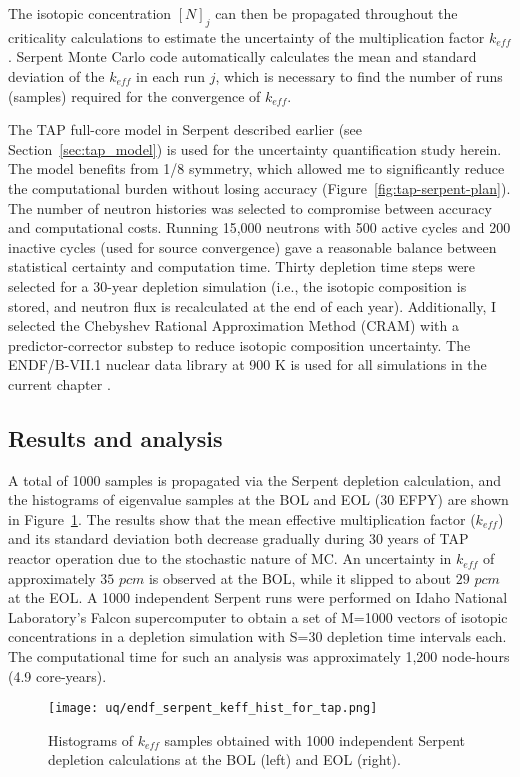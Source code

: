The isotopic concentration $[N]_j$ can then be propagated throughout the 
criticality calculations to estimate the uncertainty of the multiplication 
factor $k_{eff}$. Serpent Monte Carlo code automatically calculates the mean 
and standard deviation of the $k_{eff}$ in each run $j$, which is 
necessary to find the number of runs (samples) required for the convergence of 
$k_{eff}$.

The \gls{TAP} full-core model in Serpent described earlier (see  
Section~\ref{sec:tap_model}) is used for the uncertainty quantification study 
herein. The model benefits from 1/8 symmetry, which allowed me to 
significantly reduce the computational burden without losing accuracy
(Figure~\ref{fig:tap-serpent-plan}). The number of neutron histories was 
selected to compromise between accuracy and computational costs. Running 
15,000 neutrons with 500 active cycles and 200 inactive cycles 
(used for source convergence) gave a reasonable balance between statistical 
certainty and computation time. Thirty depletion time steps were 
selected for a 30-year depletion simulation (i.e., the isotopic composition is 
stored, and neutron flux is recalculated at the end of each year). 
Additionally, I selected the Chebyshev Rational Approximation Method (CRAM) 
with a predictor-corrector substep \cite{pusa_computing_2010} to reduce 
isotopic 
composition uncertainty. The ENDF/B-VII.1 nuclear data library at 900 K is 
used for all simulations in the current chapter 
\cite{chadwick_endf/b-vii.1_2011}.

\subsection{Results and analysis}
A total of 1000 samples is propagated via the Serpent depletion calculation,  
and the histograms of eigenvalue samples at the \gls{BOL} and \gls{EOL} (30 
\gls{EFPY}) are shown in Figure~\ref{fig:uq-serp-keff-hist}. The 
results show that the mean effective multiplication factor ($k_{eff}$) 
and its standard deviation both decrease gradually during 30 years of 
\gls{TAP} reactor operation due to the stochastic nature of \gls{MC}. 
An uncertainty in $k_{eff}$ of approximately $35$ $pcm$ is observed at the 
\gls{BOL}, while it slipped to about $29$ $pcm$ at the \gls{EOL}. A 1000 
independent Serpent runs were performed on Idaho National Laboratory's Falcon 
supercomputer to obtain a set of M=1000 vectors of isotopic concentrations in 
a depletion simulation with S=30 depletion time intervals each. The 
computational time for such an analysis was approximately 1,200 node-hours 
(4.9 core-years).
\begin{figure}[htp!] %
	\centering
	\texttt{[image: uq/endf\_serpent\_keff\_hist\_for\_tap.png]}
		\vspace{-4mm}
	\caption{Histograms of $k_{eff}$ samples obtained with 1000 independent 
	Serpent depletion calculations at the \gls{BOL} (left) and \gls{EOL} 
	(right).}
	\label{fig:uq-serp-keff-hist}
\end{figure}

